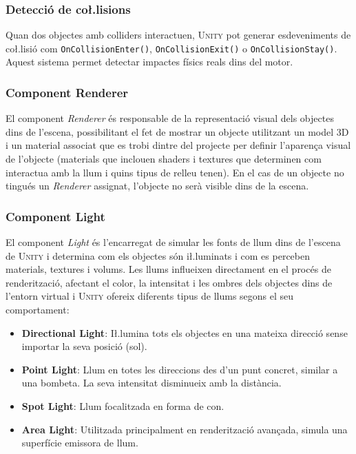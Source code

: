 \documentclass[a4paper,11pt,DIV=13,headings=normal,abstract=true,twoside=semi]{article}
\newcommand{\acro}[1]{\textsc{#1}}
\begin{document}
\subsubsection*{Detecció de co\l.lisions}

Quan dos objectes amb colliders interactuen, \acro{Unity} pot generar esdeveniments de co\l.lisió com \texttt{OnCollisionEnter()}, \texttt{OnCollisionExit()} o \texttt{OnCollisionStay()}. Aquest sistema permet detectar impactes físics reals dins del motor.

\subsubsection{Component Renderer}

El component \emph{Renderer} \cite{UnityRenderer} és responsable de la representació visual dels objectes dins de l'escena, possibilitant el fet de mostrar un objecte utilitzant un model 3D i un material associat que es trobi dintre del projecte per definir l'aparença visual de l'objecte (materials que inclouen shaders i textures que determinen com interactua amb la llum i quins tipus de relleu tenen). En el cas de un objecte no tingués un \emph{Renderer} assignat, l'objecte no serà visible dins de la escena.

\subsubsection{Component Light}
\label{sec:lights}

El component \emph{Light} \cite{UnityLighting} és l'encarregat de simular les fonts de llum dins de l'escena de \acro{Unity} i determina com els objectes són i\l.luminats i com es perceben materials, textures i volums. Les llums influeixen directament en el procés de renderització, afectant el color, la intensitat i les ombres dels objectes dins de l'entorn virtual i \acro{Unity} ofereix diferents tipus de llums segons el seu comportament:

\begin{itemize}
    \item \textbf{Directional Light}: I\l.lumina tots els objectes en una mateixa direcció sense importar la seva posició (sol).
    \item \textbf{Point Light}: Llum en totes les direccions des d'un punt concret, similar a una bombeta. La seva intensitat disminueix amb la distància.
    \item \textbf{Spot Light}: Llum focalitzada en forma de con.
    \item \textbf{Area Light}: Utilitzada principalment en renderització avançada, simula una superfície emissora de llum.
\end{itemize}
\end{document}
